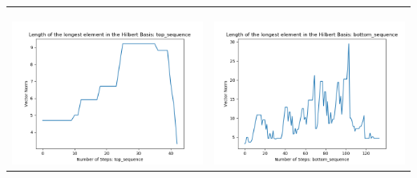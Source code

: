 \documentclass[10pt]{article}
\begin{document}
\begin{tabular}{c|c}
\begin{minipage}{.45\textwidth}
\end{minipage} \\ \\
\hline \\\begin{minipage}{.45\textwidth}
\includegraphics[width=\textwidth]{"DATA/4d/5 generators 2 bound G/top_sequence LENGTH"}
\end{minipage} &
\begin{minipage}{.45\textwidth}
\includegraphics[width=\textwidth]{"DATA/4d/5 generators 2 bound G bottomup/bottom_sequence LENGTH"}
\end{minipage}
\end{tabular}
\end{document}

